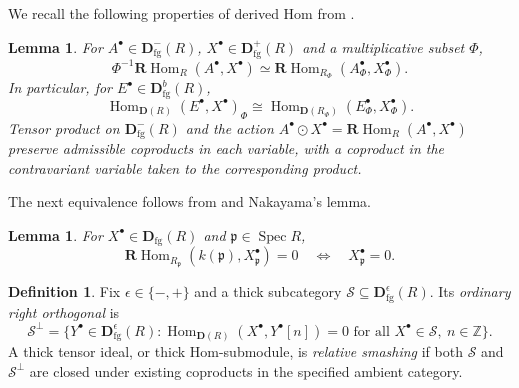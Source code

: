 \documentclass[11pt]{amsart}
\numberwithin{equation}{section}
\newtheorem{lemma}[theorem]{Lemma}
\theoremstyle{definition}
\newtheorem{definition}[theorem]{Definition}
\theoremstyle{remark}
\DeclareMathOperator{\Spec}{Spec}
\DeclareMathOperator{\Hom}{Hom}
\newcommand{\RHom}{\mathbf R\!\Hom}
\newcommand{\D}{\mathbf D}
\newcommand{\fg}{\mathrm{fg}}
\newcommand{\p}{\mathfrak p}
\begin{document}
We recall the following properties of derived Hom from
\cite[Lemma~6.4 and Appendix~B.4]{Zhu26a}.

\begin{lemma}\label{lem:hom-localization}
For $A^{\bullet}\in\D^-_{\fg}(R)$,
$X^{\bullet}\in\D^+_{\fg}(R)$ and a multiplicative subset $\Phi$,
\begin{equation}\label{eq:localization}
 \Phi^{-1}\RHom_R(A^{\bullet},X^{\bullet})\simeq
 \RHom_{R_\Phi}(A^{\bullet}_\Phi,X^{\bullet}_\Phi).
\end{equation}
In particular, for $E^{\bullet}\in\D^b_{\fg}(R)$,
\begin{equation}\label{eq:bounded-hom-localization}
 \Hom_{\D(R)}(E^{\bullet},X^{\bullet})_\Phi\cong
 \Hom_{\D(R_\Phi)}(E^{\bullet}_\Phi,X^{\bullet}_\Phi).
\end{equation}
Tensor product on $\D^-_{\fg}(R)$ and the action
$A^{\bullet}\odot X^{\bullet}=\RHom_R(A^{\bullet},X^{\bullet})$
preserve admissible coproducts in each variable, with a coproduct in
the contravariant variable taken to the corresponding product.
\end{lemma}

The next equivalence follows from
\cite[Fact~3.5 and Proposition~3.6]{SW17} and Nakayama's lemma.

\begin{lemma}\label{lem:residue-detection}
For $X^{\bullet}\in\D_{\fg}(R)$ and $\p\in\Spec R$,
\begin{equation}\label{eq:detection}
 \RHom_{R_\p}(k(\p),X^{\bullet}_\p)=0
 \quad\Longleftrightarrow\quad X^{\bullet}_\p=0.
\end{equation}
\end{lemma}

\begin{definition}\label{def:smashing}
Fix $\epsilon\in\{-,+\}$ and a thick subcategory
$\mathcal S\subseteq\D^\epsilon_{\fg}(R)$. Its \emph{ordinary right
orthogonal} is
\[
 \mathcal S^\perp=
 \{Y^{\bullet}\in\D^\epsilon_{\fg}(R):
 \Hom_{\D(R)}(X^{\bullet},Y^{\bullet}[n])=0\text{ for all }X^{\bullet}\in\mathcal S,\ n\in\mathbb Z\}.
\]
A thick tensor ideal, or thick Hom-submodule, is \emph{relative smashing}
if both $\mathcal S$ and $\mathcal S^\perp$ are closed under existing
coproducts in the specified ambient category.
\end{definition}
\end{document}

